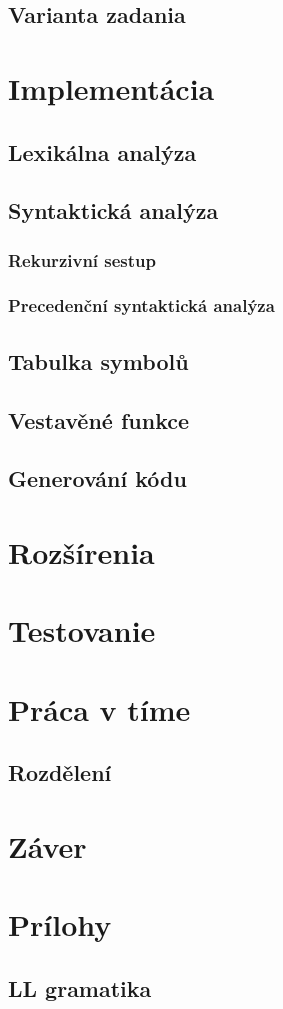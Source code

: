 \documentclass{article}
\begin{document}
        \subsection{Varianta zadania}
    
    \section{Implementácia}
    
        \subsection{Lexikálna analýza}
        
        \subsection{Syntaktická analýza}
            \subsubsection{Rekurzivní sestup}
            \subsubsection{Precedenční syntaktická analýza}
    
        \subsection{Tabulka symbolů}
        
        \subsection{Vestavěné funkce}
        
        \subsection{Generování kódu}
        
    \section{Rozšírenia}
    
    \section{Testovanie}
    
    \section{Práca v tíme}
    
        \subsection{Rozdělení}
        
    
    \section{Záver}
    
    \section{Prílohy}
        \subsection{LL gramatika}
\end{document}
